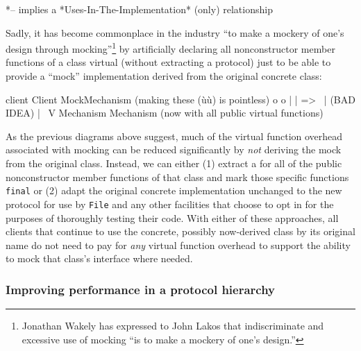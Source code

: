{{\begin{emcppslisting}
*-- implies a *Uses-In-The-Implementation* (only) relationship
\end{emcppslisting}
    

\noindent Sadly, it has become commonplace in the industry ``to make a mockery of
one's design through mocking''{\cprotect\footnote{Jonathan Wakely has
expressed to John Lakos that indiscriminate and excessive use of
  mocking ``is to make a mockery of one's design.''}} by artificially
declaring all nonconstructor member functions of a class virtual
(without extracting a protocol) just to be able to provide a ``mock''
implementation derived from the original concrete class:

\pagebreak%

\begin{emcppslisting}
client          Client  MockMechanism  (making these (ù{}ù) is pointless)
   o                 o       |
   |       =>         \      |  (BAD IDEA)
   |                   \     V
Mechanism             Mechanism   (now with all public virtual functions)
\end{emcppslisting}
    

\noindent As the previous diagrams above suggest, much of the virtual function
overhead associated with mocking can be reduced significantly by
\emph{not} deriving the mock from the original class. Instead, we can
either (1) extract a  for all of the public
nonconstructor member functions of that class and mark those specific
functions \lstinline!final! or (2) adapt the original concrete
implementation unchanged to the new protocol for use by \lstinline!File!
and any other facilities that choose to opt in for the purposes of
thoroughly testing their code. With either of these approaches, all
clients that continue to use the concrete, possibly now-derived class by
its original name do not need to pay for \emph{any} virtual function
overhead to support the ability to mock that class's interface where
needed.

\subsubsection[Improving performance in a protocol hierarchy]{Improving performance in a protocol hierarchy}\label{improving-performance-in-a-protocol-hierarchy}

}}
